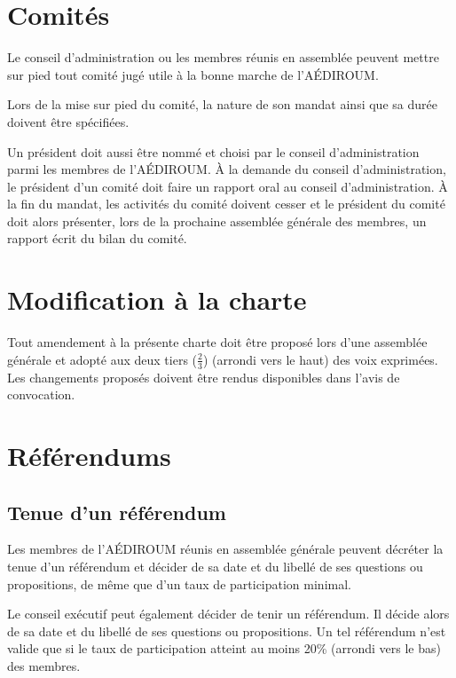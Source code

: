 \documentclass{aediroum}
\begin{document}
\section{Comités}\label{sec:comites}

Le conseil d'administration ou les membres réunis en assemblée peuvent mettre sur pied tout comité jugé utile à la bonne marche de l'AÉDIROUM.

Lors de la mise sur pied du comité, la nature de son mandat ainsi que sa durée doivent être spécifiées.

Un président doit aussi être nommé et choisi par le conseil d'administration parmi les membres de l'AÉDIROUM. À la demande du conseil d'administration, le président d'un comité doit faire un rapport oral au conseil d'administration. À la fin du mandat, les activités du comité doivent cesser et le président du comité doit alors présenter, lors de la prochaine assemblée générale des membres, un rapport écrit du bilan du comité.

\section{Modification à la charte}\label{sec:modification-a-la-charte}

Tout amendement à la présente charte doit être proposé lors d'une assemblée générale et adopté aux deux tiers (\( \frac{2}{3} \)) (arrondi vers le haut) des voix exprimées. Les changements proposés doivent être rendus disponibles dans l'avis de convocation.

\section{Référendums}\label{sec:referendums}
\subsection{Tenue d'un référendum}\label{sec:tenue-dun-referendum}
Les membres de l'AÉDIROUM réunis en assemblée générale peuvent décréter la tenue d'un référendum et décider de sa date et du libellé de ses questions ou propositions, de même que d'un taux de participation minimal.

Le conseil exécutif peut également décider de tenir un référendum. Il décide alors de sa date et du libellé de ses questions ou propositions. Un tel référendum n'est valide que si le taux de participation atteint au moins 20\% (arrondi vers le bas) des membres.
\end{document}
